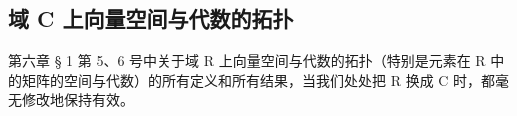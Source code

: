 \subsection{域 C 上向量空间与代数的拓扑}

第六章 § 1 第 5、6 号中关于域 R 上向量空间与代数的拓扑（特别是元素在 R 中的矩阵的空间与代数）的所有定义和所有结果，当我们处处把 R 换成 C 时，都毫无修改地保持有效。

